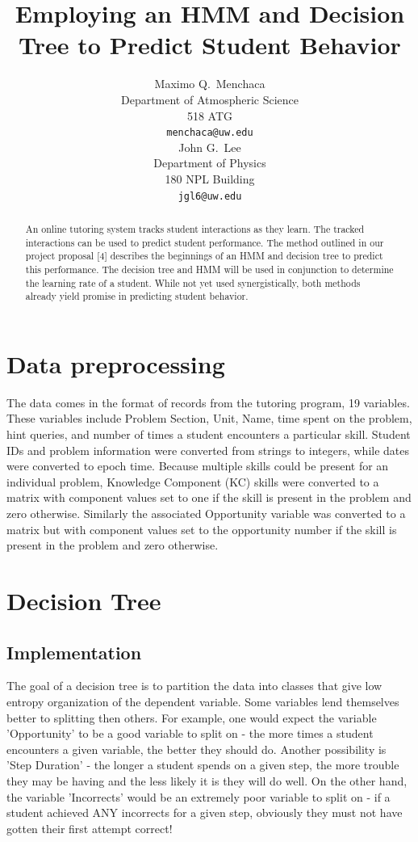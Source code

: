 \documentclass{article} %
\title{Employing an HMM and Decision Tree to Predict Student Behavior}
\author{
Maximo Q.~Menchaca\\
Department of Atmospheric Science\\
518 ATG\\
\texttt{menchaca@uw.edu} \\
\And
John G.~Lee\\
Department of Physics \\
180 NPL Building \\
\texttt{jgl6@uw.edu} \\
}
\begin{document}
\maketitle

\begin{abstract}
An online tutoring system tracks student interactions as they learn. The tracked interactions can be used to predict student performance. The method outlined in our project proposal [4] describes the beginnings of an HMM and decision tree to predict this performance. The decision tree and HMM will be used in conjunction to determine the learning rate of a student. While not yet used synergistically, both methods already yield promise in predicting student behavior.

\end{abstract}

\section{Data preprocessing}
The data comes in the format of records from the tutoring program, 19 variables. These variables include Problem Section, Unit, Name, time spent on the problem, hint queries, and number of times a student encounters a particular skill. Student IDs and problem information were converted from strings to integers, while dates were converted to epoch time. Because multiple skills could be present for an individual problem, Knowledge Component (KC) skills were converted to a matrix with component values set to one if the skill is present in the problem and zero otherwise. Similarly the associated Opportunity variable was converted to a matrix but with component values set to the opportunity number if the skill is present in the problem and zero otherwise.

\section{Decision Tree}
\subsection{Implementation}
The goal of a decision tree is to partition the data into classes that give low entropy organization of the dependent variable. Some variables lend themselves better to splitting then others. For example, one would expect the variable 'Opportunity' to be a good variable to split on - the more times a student encounters a given variable, the better they should do. Another possibility is 'Step Duration' - the longer a student spends on a given step, the more trouble they may be having and the less likely it is they will do well. On the other hand, the variable 'Incorrects' would be an extremely poor variable to split on - if a student achieved ANY incorrects for a given step, obviously they must not have gotten their first attempt correct!
\end{document}
